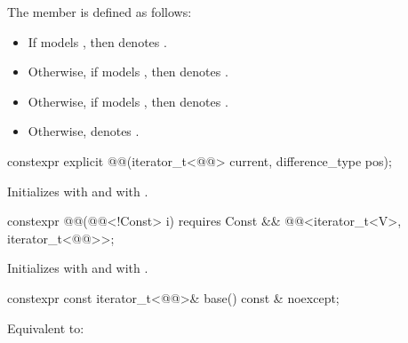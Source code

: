 \pnum
The member 
is defined as follows:
\begin{itemize}
\item
If  models ,
then  denotes .
\item
Otherwise, if  models ,
then  denotes .
\item
Otherwise, if  models ,
then  denotes .
\item
Otherwise,  denotes .
\end{itemize}

%
\begin{itemdecl}
constexpr explicit @@(iterator_t<@@> current, difference_type pos);
\end{itemdecl}

\begin{itemdescr}
\pnum
\effects
Initializes  with  and
 with .
\end{itemdescr}

%
\begin{itemdecl}
constexpr @@(@@<!Const> i)
  requires Const && @@<iterator_t<V>, iterator_t<@@>>;
\end{itemdecl}

\begin{itemdescr}
\pnum
\effects
Initializes  with  and
 with .
\end{itemdescr}

%
\begin{itemdecl}
constexpr const iterator_t<@@>& base() const & noexcept;
\end{itemdecl}

\begin{itemdescr}
\pnum
\effects
Equivalent to: 
\end{itemdescr}


